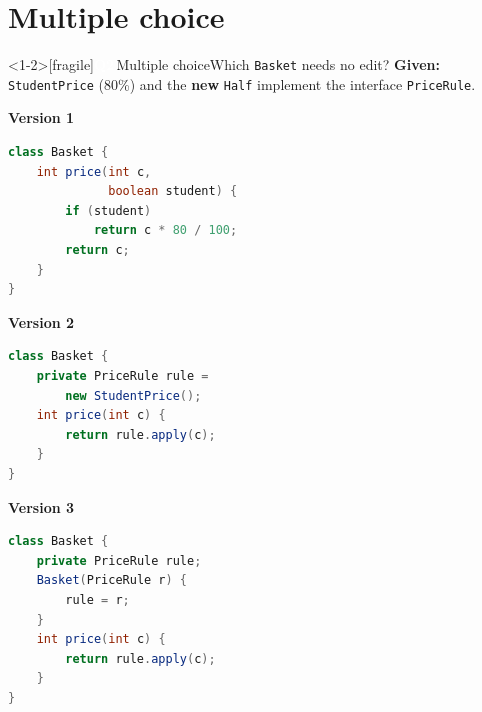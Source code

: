 \documentclass[aspectratio=169]{beamer}
\newcommand{\code}[1]{\texttt{#1}}
\newcommand{\neutrallabel}[1]{\textcolor{bkblue}{\textbf{#1}}}
\newcommand{\qb}[2]{\colorbox{bkblue}{\textcolor{white}{\normalsize\bfseries\sffamily Q#1}}\,{\normalsize\sffamily\textcolor{bkblue!75}{#2}}\enspace}
\begin{document}
\section{Multiple choice}

\begin{frame}<1-2>[fragile]{\qb{2}{Multiple choice}Which \code{Basket} needs no edit?}
  \neutrallabel{Given:} {\small \code{StudentPrice} (80\%) and the \textbf{new}
  \code{Half} implement the interface \code{PriceRule}.}\\
  \begin{minipage}[t]{0.315\textwidth}
    \neutrallabel{Version 1}
\begin{lstlisting}[language=Java,basicstyle=\ttfamily\fontsize{6.8}{7.9}\selectfont]
class Basket {
    int price(int c,
              boolean student) {
        if (student)
            return c * 80 / 100;
        return c;
    }
}
\end{lstlisting}
  \end{minipage}\hfill
  \begin{minipage}[t]{0.315\textwidth}
    \neutrallabel{Version 2}
\begin{lstlisting}[language=Java,basicstyle=\ttfamily\fontsize{6.8}{7.9}\selectfont]
class Basket {
    private PriceRule rule =
        new StudentPrice();
    int price(int c) {
        return rule.apply(c);
    }
}
\end{lstlisting}
  \end{minipage}\hfill
  \begin{minipage}[t]{0.315\textwidth}
    \neutrallabel{Version 3}
\begin{lstlisting}[language=Java,basicstyle=\ttfamily\fontsize{6.8}{7.9}\selectfont]
class Basket {
    private PriceRule rule;
    Basket(PriceRule r) {
        rule = r;
    }
    int price(int c) {
        return rule.apply(c);
    }
}
\end{lstlisting}
  \end{minipage}


\end{frame}
\end{document}
